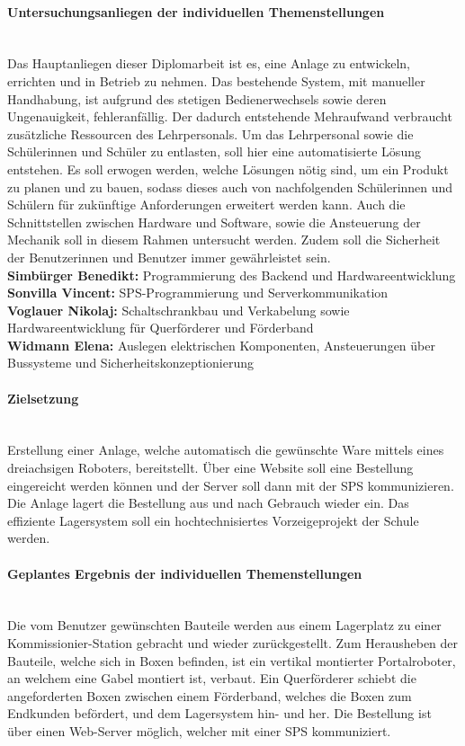 \paragraph{Untersuchungsanliegen der individuellen Themenstellungen}\mbox{}\\
Das Hauptanliegen dieser Diplomarbeit ist es, eine Anlage zu entwickeln, errichten und in Betrieb zu nehmen. Das bestehende System, mit manueller Handhabung, ist aufgrund des stetigen Bedienerwechsels sowie deren Ungenauigkeit, fehleranfällig. Der dadurch entstehende Mehraufwand verbraucht zusätzliche Ressourcen des Lehrpersonals. Um das Lehrpersonal sowie die Schülerinnen und Schüler zu entlasten, soll hier eine automatisierte Lösung entstehen. Es soll erwogen werden, welche Lösungen nötig sind, um ein Produkt zu planen und zu bauen, sodass dieses auch von nachfolgenden Schülerinnen und Schülern für zukünftige Anforderungen erweitert werden kann. Auch die Schnittstellen zwischen Hardware und Software, sowie die Ansteuerung der Mechanik soll in diesem Rahmen untersucht werden. Zudem soll die Sicherheit der Benutzerinnen und Benutzer immer gewährleistet sein.\\
\textbf{Simbürger Benedikt:} Programmierung des Backend und Hardwareentwicklung\\
\textbf{Sonvilla Vincent:} SPS-Programmierung und Serverkommunikation\\
\textbf{Voglauer Nikolaj:} Schaltschrankbau und Verkabelung sowie Hardwareentwicklung für Querförderer und Förderband\\
\textbf{Widmann Elena:} Auslegen elektrischen Komponenten, Ansteuerungen über Bussysteme und Sicherheitskonzeptionierung

\paragraph{Zielsetzung}\mbox{}\\
Erstellung einer Anlage, welche automatisch die gewünschte Ware mittels eines dreiachsigen Roboters, bereitstellt. Über eine Website soll eine Bestellung eingereicht werden können und der Server soll dann mit der SPS kommunizieren. Die Anlage lagert die Bestellung aus und nach Gebrauch wieder ein. Das effiziente Lagersystem soll ein hochtechnisiertes Vorzeigeprojekt der Schule werden.

\paragraph{Geplantes Ergebnis der individuellen Themenstellungen}\mbox{}\\
Die vom Benutzer gewünschten Bauteile werden aus einem Lagerplatz zu einer Kommissionier-Station gebracht und wieder zurückgestellt. Zum Herausheben der Bauteile, welche sich in Boxen befinden, ist ein vertikal montierter Portalroboter, an welchem eine Gabel montiert ist, verbaut. Ein Querförderer schiebt die angeforderten Boxen zwischen einem Förderband, welches die Boxen zum Endkunden befördert, und dem Lagersystem hin- und her. Die Bestellung ist über einen Web-Server möglich, welcher mit einer SPS kommuniziert.

